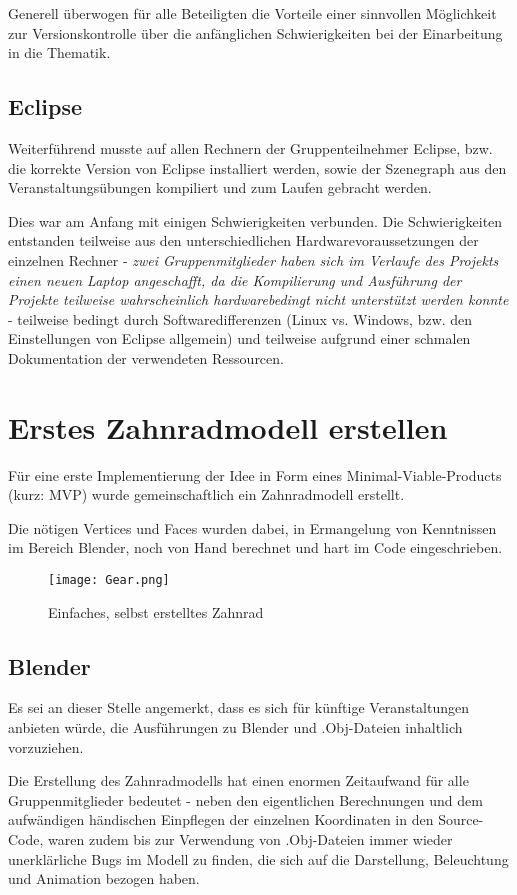 \documentclass{article}
\begin{document}
Generell überwogen für alle Beteiligten die Vorteile einer sinnvollen Möglichkeit zur Versionskontrolle über die anfänglichen Schwierigkeiten bei der Einarbeitung in die Thematik.


\subsection{Eclipse}
Weiterführend musste auf allen Rechnern der Gruppenteilnehmer Eclipse, bzw. die korrekte Version von Eclipse installiert werden, sowie der Szenegraph aus den Veranstaltungsübungen kompiliert und zum Laufen gebracht werden. \label{EclipseProbleme}

Dies war am Anfang mit einigen Schwierigkeiten verbunden. 
Die Schwierigkeiten entstanden teilweise aus den unterschiedlichen Hardwarevoraussetzungen der einzelnen Rechner - \textit{zwei Gruppenmitglieder haben sich im Verlaufe des Projekts einen neuen Laptop angeschafft, da die Kompilierung und Ausführung der Projekte teilweise wahrscheinlich hardwarebedingt nicht unterstützt werden konnte} - teilweise bedingt durch Softwaredifferenzen (Linux vs. Windows, bzw. den Einstellungen von Eclipse allgemein) und teilweise aufgrund einer schmalen Dokumentation der verwendeten Ressourcen. 



\section{Erstes Zahnradmodell erstellen}
Für eine erste Implementierung der Idee in Form eines Minimal-Viable-Products (kurz: MVP) wurde gemeinschaftlich ein Zahnradmodell erstellt. 

Die nötigen Vertices und Faces wurden dabei, in Ermangelung von Kenntnissen im Bereich Blender, noch von Hand berechnet und hart im Code eingeschrieben. 

\begin{figure}
\centering
\texttt{[image: Gear.png]}
\caption{Einfaches, selbst erstelltes Zahnrad}
\label{fig:gear}
\end{figure}

\subsection{Blender}
Es sei an dieser Stelle angemerkt, dass es sich für künftige Veranstaltungen anbieten würde, die Ausführungen zu Blender und .Obj-Dateien inhaltlich vorzuziehen. 

Die Erstellung des Zahnradmodells hat einen enormen Zeitaufwand für alle Gruppenmitglieder bedeutet - neben den eigentlichen Berechnungen und dem aufwändigen händischen Einpflegen der einzelnen Koordinaten in den Source-Code, waren zudem bis zur Verwendung von .Obj-Dateien immer wieder unerklärliche Bugs im Modell zu finden, die sich auf die Darstellung, Beleuchtung und Animation bezogen haben. 
\end{document}
